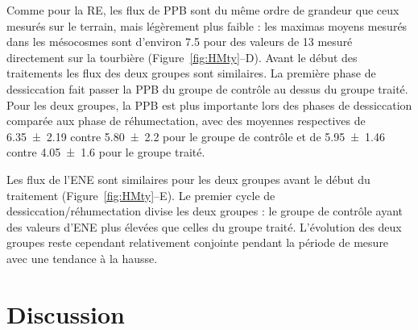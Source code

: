 Comme pour la RE, les flux de PPB sont du même ordre de grandeur que ceux mesurés sur le terrain, mais légèrement plus faible : les maximas moyens mesurés dans les mésocosmes sont d'environ \num{7.5} pour des valeurs de \SI{13}{\uml} mesuré directement sur la tourbière (Figure~\ref{fig:HMty}--D).
Avant le début des traitements les flux des deux groupes sont similaires.
La première phase de dessiccation fait passer la PPB du groupe de contrôle au dessus du groupe traité.
Pour les deux groupes, la PPB est plus importante lors des phases de dessiccation comparée aux phase de réhumectation, avec des moyennes respectives de \num{6.35(219)} contre \num{5.80(220)} pour le groupe de contrôle et de \num{5.95(146)} contre \SI{4.05(160)}{\uml} pour le groupe traité.

Les flux de l'ENE sont similaires pour les deux groupes avant le début du traitement (Figure~\ref{fig:HMty}--E).
Le premier cycle de dessiccation/réhumectation divise les deux groupes : le groupe de contrôle ayant des valeurs d'ENE plus élevées que celles du groupe traité.
L'évolution des deux groupes reste cependant relativement conjointe pendant la période de mesure avec une tendance à la hausse.

%
%
%

\section{Discussion}


